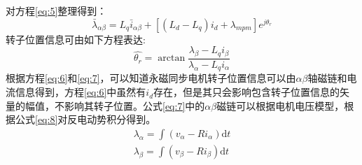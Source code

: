 对方程\ref{eq:5}整理得到：
\begin{equation}\label{eq:6}
\bar{\lambda}_{\alpha\beta}=L_{q}\bar{i}_{\alpha\beta}+[(L_{d}-L_{q})i_{d}+\lambda_{mpm}]e^{j\theta_{r}}
\end{equation}
转子位置信息可由如下方程表达:
\begin{equation}\label{eq:7}
\hat{\theta_{r}}=\arctan\frac{\lambda_{\beta}-L_{q}i_{\beta}}{\lambda_{\alpha}-L_{q}i_{\alpha}}
\end{equation}    
根据方程\ref{eq:6}和\ref{eq:7}，可以知道永磁同步电机转子位置信息可以由$\alpha\beta$轴磁链和电流信息得到，方程\ref{eq:6}中虽然有$i_{d}$存在，但是其只会影响包含转子位置信息的矢量的幅值，不影响其转子位置。公式\ref{eq:7}中的$\alpha\beta$磁链可以根据电机电压模型，根据公式\ref{eq:8}对反电动势积分得到。
\begin{equation}
\begin{gathered}\label{eq:8}
\lambda_{\alpha}=\int (v_{\alpha}-Ri_{\alpha}) \mathrm{d}t\\
\lambda_{\beta}=\int (v_{\beta}-Ri_{\beta}) \mathrm{d}t
\end{gathered}
\end{equation}
